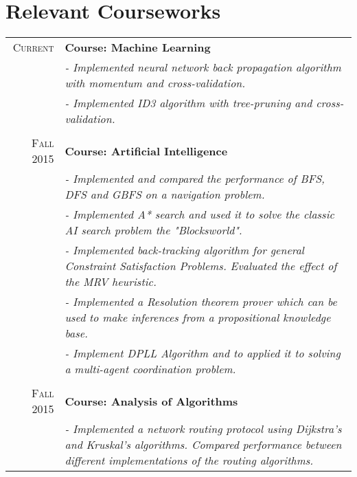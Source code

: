 \documentclass[a4paper,10pt]{article}
\begin{document}
\section{Relevant Courseworks}
\begin{tabular}{rp{12cm}}

    \textsc{Current}
    &\textbf{Course: Machine Learning}\\
    &\textit{- Implemented neural network back propagation algorithm with momentum and cross-validation.}\\
    &\textit{- Implemented ID3 algorithm with tree-pruning and cross-validation.}\\
    
    \\
    
    \textsc{Fall 2015}
    &\textbf{Course: Artificial Intelligence}\\
    &\textit{- Implemented and compared the performance of BFS, DFS and GBFS on a navigation problem.}\\
    &\textit{- Implemented A* search and used it to solve the classic AI search problem the "Blocksworld".}\\
    &\textit{- Implemented back-tracking algorithm for general Constraint Satisfaction Problems. Evaluated the effect of the MRV heuristic.}\\
    &\textit{- Implemented a Resolution theorem prover which can be used to make inferences from a propositional knowledge base.}\\
    &\textit{- Implement DPLL Algorithm and to applied it to solving a multi-agent coordination problem.}\\
    
    \\ 
    
    \textsc{Fall 2015}
    &\textbf{Course: Analysis of Algorithms}\\
    &\textit{- Implemented a network routing protocol using Dijkstra's and Kruskal's algorithms. Compared performance between different implementations of the routing algorithms.}\\

\end{tabular}
\end{document}
